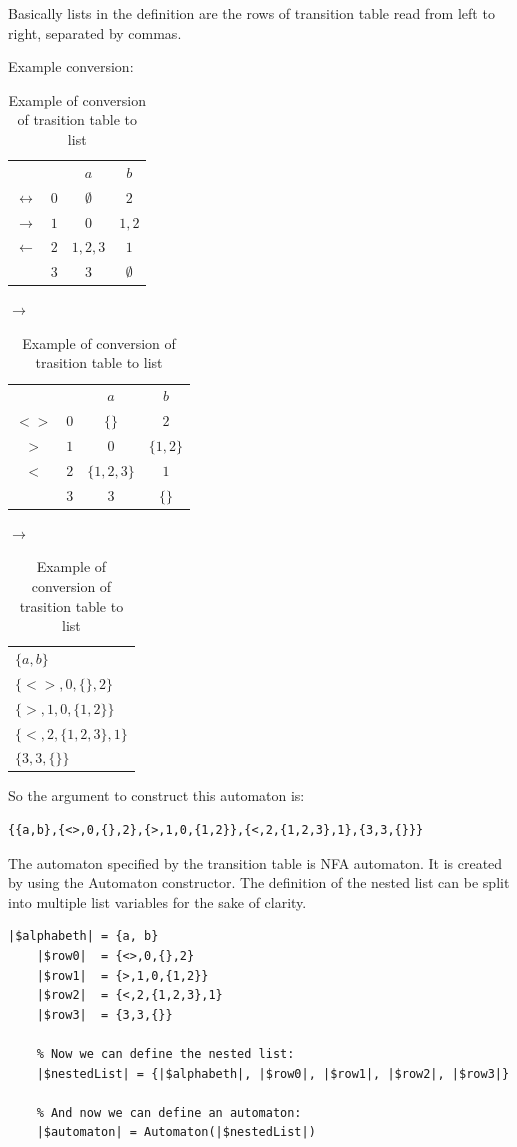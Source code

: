 \documentclass{ctuthesis}
\begin{document}
Basically lists in the definition are the rows of transition table read from left to right, separated by commas.

Example conversion:
\begin{table}[H]
\begin{ctucolortab}
\begin{tabular}{cc|cc}
	&	& $a$	& $b$ \\\Midrule
$\leftrightarrow$	& $0$	& $\emptyset$	& $2$ \\
$\rightarrow$	& $1$ & $0$ & $1,2$ \\
$\leftarrow$	& $2$ & $1,2,3$ & $1$ \\
				& $3$ & $3$	& $\emptyset$ 
\end{tabular}
\quad
$\rightarrow$
\begin{tabular}{|c|c|c|c|}
\hline
	&&$a$&$b$ \\
	$<>$ & $0$ & $\{\}$ & $2$ \\
	$>$ & $1$ & $0$ & $\{1,2\}$ \\
	$<$ & $2$ & $\{1,2,3\}$ & $1$ \\
		& $3$ & $3$ & $\{\}$\\
		\hline
\end{tabular}
\quad 
$\rightarrow$
\begin{tabular}{|l|}
\hline 
$\{a, b\}$ \\
$\{<>,0,\{\}, 2\}$ \\
$\{>,1,0,\{1,2\}\}$ \\
$\{<,2,\{1,2,3\},1\}$ \\
$\{3, 3, \{\}\}$ \\\hline
\end{tabular}
\end{ctucolortab}
\caption{Example of conversion of trasition table to list}
\label{fig:example_conversion}
\end{table}

So the argument to construct this automaton is:
\begin{lstlisting}[language = JASL_snippet]
	{{a,b},{<>,0,{},2},{>,1,0,{1,2}},{<,2,{1,2,3},1},{3,3,{}}}
\end{lstlisting}

The automaton specified by the transition table is NFA automaton. It is created by using the Automaton constructor. The definition of the nested list can be split into multiple list variables for the sake of clarity. 

\begin{minipage}{\linewidth}
\begin{lstlisting}[language = JASL]
	|$alphabeth| = {a, b}
	|$row0|  = {<>,0,{},2}
	|$row1|  = {>,1,0,{1,2}}
	|$row2|  = {<,2,{1,2,3},1}
	|$row3|  = {3,3,{}}
	
	% Now we can define the nested list:
	|$nestedList| = {|$alphabeth|, |$row0|, |$row1|, |$row2|, |$row3|}
    
	% And now we can define an automaton:
	|$automaton| = Automaton(|$nestedList|)
\end{lstlisting}
\end{minipage}
\end{document}
